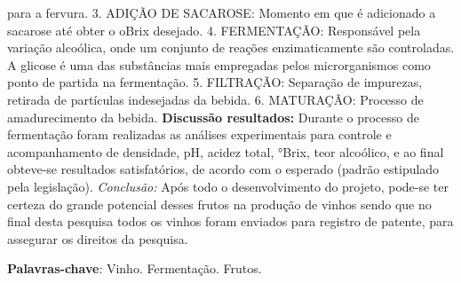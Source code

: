 \documentclass[article,12pt,onesidea,4paper,english,brazil]{abntex2}
\begin{document}
	para a fervura. 3. ADIÇÃO DE SACAROSE: Momento em que é adicionado a
	sacarose até obter o oBrix desejado. 4. FERMENTAÇÃO: Responsável pela variação
	alcoólica, onde um conjunto de reações enzimaticamente são controladas. A glicose
	é uma das substâncias mais empregadas pelos microrganismos como ponto de
	partida na fermentação. 5. FILTRAÇÃO: Separação de impurezas, retirada de
	partículas indesejadas da bebida. 6. MATURAÇÃO: Processo de amadurecimento
	da bebida. \textbf{Discussão resultados:} Durante o processo de fermentação foram
	realizadas as análises experimentais para controle e acompanhamento de
	densidade, pH, acidez total, °Brix, teor alcoólico, e ao final obteve-se resultados
	satisfatórios, de acordo com o esperado (padrão estipulado pela legislação).
	\textit{Conclusão:} Após todo o desenvolvimento do projeto, pode-se ter certeza do grande
	potencial desses frutos na produção de vinhos sendo que no final desta pesquisa
	todos os vinhos foram enviados para registro de patente, para assegurar os direitos
	da pesquisa.
	
	\vspace{\onelineskip}
	
	\noindent
	\textbf{Palavras-chave}: Vinho. Fermentação. Frutos.
	
\end{document}
